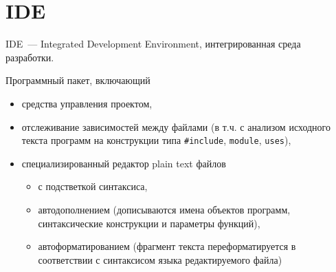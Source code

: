 \part{IDE}

IDE\ --- Integrated Development Environment, интегрированная среда разработки.

Программный пакет, включающий 
\begin{itemize}
  \item средства управления проектом,
  \item отслеживание зависимостей между файлами (в т.ч. с анализом исходного
  текста программ на конструкции типа \verb|#include|, \verb|module|,
  \verb|uses|),
  \item специализированный редактор plain text
  файлов
  \begin{itemize}
    \item с подстветкой синтаксиса,
  	\item автодополнением (дописываются имена объектов программ, 
  	синтаксические конструкции и параметры функций),
  	\item автоформатированием (фрагмент текста переформатируется в соответствии
  	с синтаксисом языка редактируемого файла)
  \end{itemize}
\end{itemize} 




